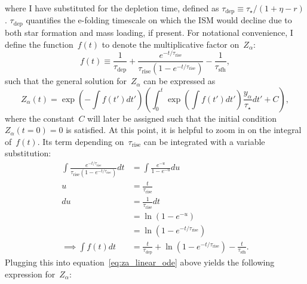 \documentclass[12pt]{article}
\newcommand{\timescale}[1]{\ensuremath{\tau_\text{#1}}}
\begin{document}
where I have substituted for the depletion time, defined as
$\timescale{dep} \equiv \tau_\star / (1 + \eta - r)$.
$\timescale{dep}$ quantifies the e-folding timescale on which the ISM would
decline due to both star formation and mass loading, if present.
For notational convenience, I define the function~$f(t)$ to denote the
multiplicative factor on~$Z_\alpha$:
\begin{equation}
f(t) \equiv \frac{1}{\timescale{dep}} + \frac{
	e^{-t / \timescale{rise}}
}{
	\timescale{rise}(1 - e^{-t / \timescale{rise}})
} - \frac{1}{\timescale{sfh}},
\end{equation}
such that the general solution for~$Z_\alpha$ can be expressed as
\begin{equation}
Z_\alpha(t) = \exp\left(-\int f(t') dt'\right)\left(
\int_0^t \exp\left(\int f(t') dt'\right) \frac{y_\alpha}{\tau_\star} dt' + C
\right),
\label{eq:za_linear_ode}
\end{equation}
where the constant~$C$ will later be assigned such that the initial
condition~$Z_\alpha(t = 0) = 0$ is satisfied.
At this point, it is helpful to zoom in on the integral of~$f(t)$.
Its term depending on~$\timescale{rise}$ can be integrated with a variable
substitution:
\begin{subequations}\begin{align}
\int \frac{
	e^{-t / \timescale{rise}}
}{
	\timescale{rise}(1 - e^{-t / \timescale{rise}})
} dt
&= \int \frac{e^{-u}}{1 - e^{-u}} du
\\
u &= \frac{t}{\timescale{rise}}
\\
du &= \frac{1}{\timescale{rise}} dt
\\
&= \ln (1 - e^{-u})
\\
&= \ln (1 - e^{-t / \timescale{rise}})
\\
\implies \int f(t) dt
&= \frac{t}{\timescale{dep}} + \ln (1 - e^{-t / \timescale{rise}}) -
\frac{t}{\timescale{sfh}}.
\end{align}\end{subequations}
Plugging this into equation~\ref{eq:za_linear_ode} above yields the following
expression for~$Z_\alpha$:
\end{document}
